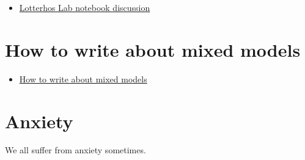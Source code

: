 \documentclass[
  letterpaper,
  DIV=11,
  numbers=noendperiod]{scrreprt}
\providecommand{\tightlist}{%
  \setlength{\itemsep}{0pt}\setlength{\parskip}{0pt}}\usepackage{longtable,booktabs,array}
\begin{document}
\begin{itemize}
\tightlist
\item
  \href{https://drive.google.com/file/d/1HIVVvMbaF8XW0Jxyh708EYBTegkneJ_C/view?usp=sharing}{Lotterhos
  Lab notebook discussion}
\end{itemize}

\hypertarget{how-to-write-about-mixed-models}{%
\section*{\texorpdfstring{\textbf{How to write about mixed
models}}{How to write about mixed models}}\label{how-to-write-about-mixed-models}}

\begin{itemize}
\tightlist
\item
  \href{https://docs.google.com/document/d/1jQZkbZbZuWnElYmLUntg5qgh1NG2-yAbsT3zzvmbkZ0/edit\#heading=h.btb80w3ha1pf}{How
  to write about mixed models}
\end{itemize}

\hypertarget{anxiety}{%
\section*{\texorpdfstring{\textbf{Anxiety}}{Anxiety}}\label{anxiety}}

We all suffer from anxiety sometimes.
\end{document}
